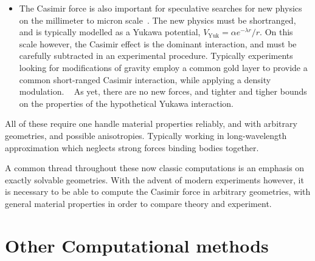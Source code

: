 \begin{itemize}
\begin{itemize}
\item The Casimir force is also important for speculative searches for new physics on the millimeter to micron
scale~\cite{Gervaci}.  The new physics must be shortranged, and is typically modelled as 
a Yukawa potential, $V_{\text{Yuk}}=\alpha e^{-\lambda r}/r$.  
On this scale however, the Casimir effect is the dominant interaction, and must be 
carefully subtracted in an experimental procedure.  Typically experiments looking for modifications
of gravity employ a common gold layer to provide a common short-ranged Casimir interaction, while
applying a density modulation.  ~\cite{Tino, Gervaci}
As yet, there are no new forces, and tighter and tigher bounds on the properties of the hypothetical
Yukawa interaction.  

\end{itemize}
All of these require one handle material properties reliably, and with arbitrary geometries,
and possible anisotropies.  Typically working in long-wavelength approximation which neglects strong
forces binding bodies together.    

A common thread throughout these now classic computations is an emphasis on exactly solvable
geometries.  With the advent of modern experiments however, it is necessary to be able 
to compute the Casimir force in arbitrary geometries, with general material properties in order
to compare theory and experiment.  






\section{Other Computational methods}


\end{itemize}
